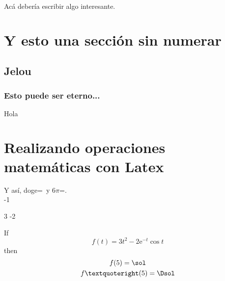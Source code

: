 \documentclass[]{article}
\begin{document}
Acá debería escribir algo interesante.

\section*{Y esto una sección sin numerar}

\subsection{Jelou}

\subsubsection{Esto puede ser eterno...}
Hola

\newpage
\section{Realizando operaciones matemáticas con Latex}

\newcommand{\mult}[3]{
	\MULTIPLY{#1}{#2}{#3}
}

\mult{\numberPI}{6}{\seisPI}
\mult{2}{4}{\doge}

Y así, doge=\doge\ y $6\pi$=\seisPI. \\

\SCALEVARIABLEfunction
{-1}{\EXPfunction}
{\NEGEXPfunction}


\PRODUCTfunction
{\NEGEXPfunction}
{\COSfunction}
{\NEGEXPCOSfunction}

\LINEARCOMBINATIONfunction
{3}{\SQUAREfunction}
{-2}{\NEGEXPCOSfunction}
{\myfunction}



If
\[
f(t)=3t^2-2\mathrm{e}^{-t}\cos t
\]
then
\[
\begin{gathered}
f(5)=\sol\\
f’(5)=\Dsol
\end{gathered}
\]
\end{document}
